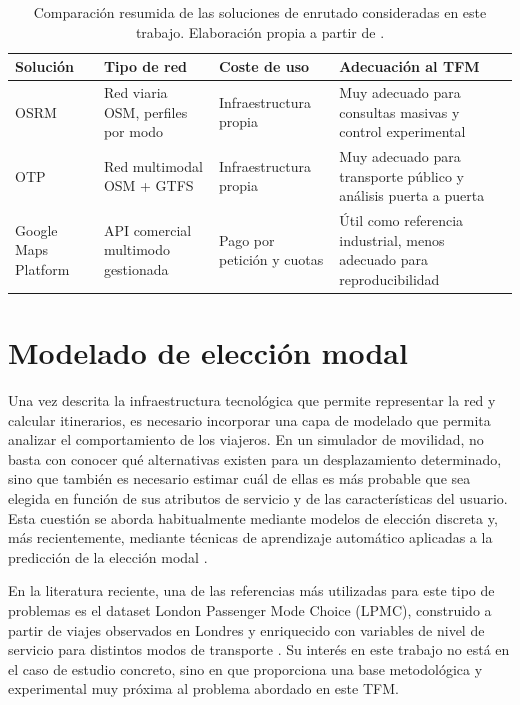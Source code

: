 \begin{table}[ht]
    \centering
    \caption{Comparación resumida de las soluciones de enrutado consideradas en este trabajo. Elaboración propia a partir de \cite{OSRMDocs,OTPDocs,GoogleRoutesAPI,GoogleMapsPricing}.}
    \label{tab:routing_comparison}
    \begin{tabular}{L{2.0cm}L{2.8cm}L{2.8cm}L{4.0cm}}
        \hline
        \textbf{Solución} & \textbf{Tipo de red} & \textbf{Coste de uso} & \textbf{Adecuación al TFM} \\
        \hline
        OSRM & Red viaria OSM, perfiles por modo & Infraestructura propia & Muy adecuado para consultas masivas y control experimental \\
        \hline
        OTP & Red multimodal OSM + GTFS & Infraestructura propia & Muy adecuado para transporte público y análisis puerta a puerta \\
        \hline
        Google Maps Platform & API comercial multimodo gestionada & Pago por petición y cuotas & Útil como referencia industrial, menos adecuado para reproducibilidad \\
        \hline
    \end{tabular}
\end{table}

\section{Modelado de elección modal}

Una vez descrita la infraestructura tecnológica que permite representar la red y calcular itinerarios, es necesario incorporar una capa de modelado que permita analizar el comportamiento de los viajeros. En un simulador de movilidad, no basta con conocer qué alternativas existen para un desplazamiento determinado, sino que también es necesario estimar cuál de ellas es más probable que sea elegida en función de sus atributos de servicio y de las características del usuario. Esta cuestión se aborda habitualmente mediante modelos de elección discreta y, más recientemente, mediante técnicas de aprendizaje automático aplicadas a la predicción de la elección modal \cite{Train2009,MartinBaos2023Thesis}.

En la literatura reciente, una de las referencias más utilizadas para este tipo de problemas es el dataset London Passenger Mode Choice (LPMC), construido a partir de viajes observados en Londres y enriquecido con variables de nivel de servicio para distintos modos de transporte \cite{Hillel2018LPMC,CSLPMC2019}. Su interés en este trabajo no está en el caso de estudio concreto, sino en que proporciona una base metodológica y experimental muy próxima al problema abordado en este TFM.

